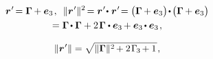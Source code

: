 \nopagebreak\vspace{-0.5em}\begin{multline*}
\currentlocationvector{\hspace{.1ex}'} \hspace{-0.3ex} = \firstdeformationvectorcosseratline \hspace{-0.1ex} + \bm{e}_{3}
\hspace{.2ex} ,
\hspace{.5em}
\| \currentlocationvector{\hspace{.1ex}'} \|^{2} \hspace{-0.3ex}
= \currentlocationvector{\hspace{.1ex}'} \hspace{-0.4ex} \dotp \hspace{.1ex} \currentlocationvector{\hspace{.1ex}'} \hspace{-0.4ex}
= \bigl( \firstdeformationvectorcosseratline \hspace{-0.1ex} + \bm{e}_{3} \bigr) \hspace{-0.3ex} \dotp \hspace{-0.2ex} \bigl( \firstdeformationvectorcosseratline \hspace{-0.1ex} + \bm{e}_{3} \bigr)
\\
%
= \firstdeformationvectorcosseratline \hspace{-0.2ex} \dotp \firstdeformationvectorcosseratline + 2 \hspace{.2ex} \firstdeformationvectorcosseratline \dotp \bm{e}_{3} \hspace{-0.2ex} + \bm{e}_{3} \hspace{-0.2ex} \dotp \bm{e}_{3}
\hspace{.2ex} ,
\end{multline*}

\nopagebreak\vspace{-0.2em}\begin{equation*}
\| \bm{r}{\hspace{.1ex}'} \|
= \displaystyle\sqrt{ \| {\bm{\Gamma}} \|^{2} \hspace{-0.2ex} + 2 \hspace{.2ex} {\Gamma_{\hspace{-0.2ex}3}} \hspace{-0.2ex} + 1 \hspace{.2ex} }
\hspace{.1ex} ,
\end{equation*}


